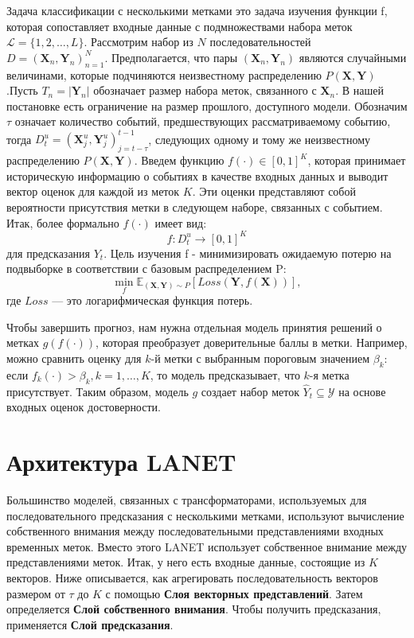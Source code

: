 \documentclass[a4paper, 12pt]{article} %
\begin{document}
Задача классификации с несколькими метками это задача изучения функции f, которая сопоставляет входные данные с подмножествами набора меток $\mathcal{L} = \{1, 2, \dots , L\}$. Рассмотрим набор из $N$ последовательностей $D = {(\mathbf{X}_n, \mathbf{Y}_n)}^{N}_{n=1}$. Предполагается, что пары $(\mathbf{X}_n, \mathbf{Y}_n)$ являются случайными величинами, которые подчиняются неизвестному распределению $P(\mathbf{X}, \mathbf{Y})$.Пусть $T_n = |\mathbf{Y}_n|$ обозначает
размер набора меток, связанного с $\mathbf{X}_n$. В нашей постановке есть ограничение на размер прошлого, доступного модели. Обозначим $\tau$ означает количество событий, предшествующих рассматриваемому событию, тогда $D^u_t = {(\mathbf{X}^u_j, \mathbf{Y}^u_j)}_{j = t - \tau}^{t-1}$, следующих одному и тому же неизвестному распределению $P(\mathbf{X}, \mathbf{Y})$. Введем функцию $f(\cdot) \in [0, 1]^K$, которая принимает историческую информацию о событиях в качестве входных данных и выводит вектор оценок для каждой из меток $K$. Эти оценки представляют собой вероятности присутствия метки в следующем наборе, связанных с событием. Итак, более формально $f(\cdot)$ имеет вид:
$$
f: D^u_t \to [0, 1]^K 
$$
для предсказания $Y_{t}.$
Цель изучения f - минимизировать ожидаемую потерю на подвыборке в соответствии с базовым распределением P:
$$\displaystyle\min_f \mathbb{E}_{(\mathbf{X},\mathbf{Y})\sim P} [Loss(\mathbf{Y}, f(\mathbf{X}))],$$ где $Loss$ --- это логарифмическая функция потерь.

Чтобы завершить прогноз, нам нужна отдельная модель принятия решений о метках $g(f(\cdot))$, которая преобразует доверительные баллы в метки.
Например, можно сравнить оценку для $k$-й метки с выбранным пороговым значением $\beta_k$: если $f_k(\cdot) > \beta_k, k = 1, \dots, K$, то модель предсказывает, что $k$-я метка присутствует. Таким образом, модель $g$ создает набор меток $\hat{Y}_{t} \subseteq \mathcal{Y}$ на основе входных оценок достоверности.  

\section{Архитектура LANET}
Большинство моделей, связанных с трансформаторами, используемых для последовательного предсказания с несколькими метками, используют вычисление собственного внимания между последовательными представлениями входных временных меток. 
Вместо этого LANET использует собственное внимание между представлениями меток. 
Итак, у него есть входные данные, состоящие из $K$ векторов.
Ниже описывается, как агрегировать последовательность векторов размером от $\tau$ до $K$ с помощью \textbf{Слоя векторных представлений}. Затем определяется \textbf{Слой собственного внимания}.
Чтобы получить предсказания, применяется \textbf{Слой предсказания}.
\end{document}
